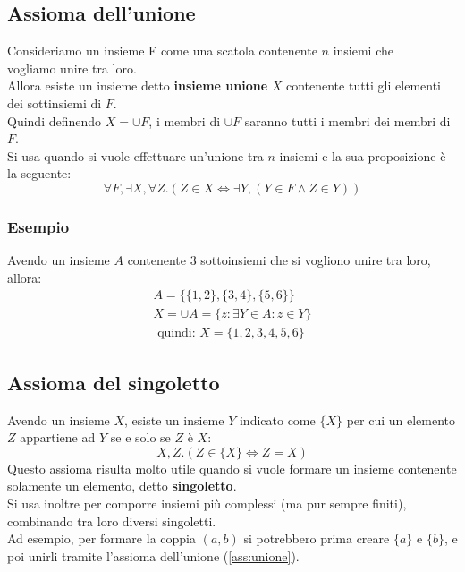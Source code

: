 \documentclass[12pt]{article}
\begin{document}
\subsection{Assioma dell'unione}
Consideriamo un insieme F come una scatola contenente $n$ insiemi che\\
vogliamo unire tra loro.\\
Allora esiste un insieme detto \textbf{insieme unione} $X$ contenente tutti gli elementi dei sottinsiemi di $F$.  \\
Quindi definendo $X = \cup F$, i membri di $\cup F$ saranno tutti i membri dei membri di $F$.\\
Si usa quando si vuole effettuare un'unione tra $n$ insiemi e la sua proposizione è la seguente:
\begin{equation}
    \forall F, \exists X, \forall Z. (Z \in X \Leftrightarrow \exists Y, (Y \in F \wedge Z \in Y)) \label{ass:unione} \tag{ax. 4}
\end{equation}
\subsubsection{Esempio}
Avendo un insieme $A$ contenente $3$ sottoinsiemi che si vogliono unire tra loro, allora:
\begin{gather*}
    A = \{\{1, 2\}, \{3, 4\}, \{5, 6\}\}\\
    X = \cup A = \{z : \exists Y \in A : z \in Y\}\\
    \text{ quindi: } X = \{1, 2, 3, 4, 5, 6\}
\end{gather*}
\subsection{Assioma del singoletto}
Avendo un insieme $X$, esiste un insieme $Y$ indicato come $\{X\}$ per cui un elemento $Z$ appartiene ad $Y$ se e solo se $Z$ è $X$:
\begin{equation}
    X, Z.(Z \in \{X\} \Leftrightarrow Z = X) \label{ass:singoletto} \tag{ax. 5}
\end{equation}
Questo assioma risulta molto utile quando si vuole formare un insieme contenente solamente un elemento, detto \textbf{singoletto}.\\
Si usa inoltre per comporre insiemi più complessi (ma pur sempre finiti), combinando tra loro diversi singoletti.\\
Ad esempio, per formare la coppia $(a, b)$ si potrebbero prima creare $\{a\} \text{ e } \{b\}$, e poi unirli tramite l'assioma dell'unione (\ref{ass:unione}).
\pagebreak
\end{document}
